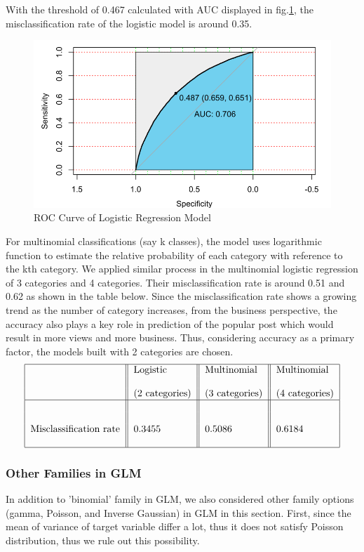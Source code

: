 \documentclass[letterpaper,12pt]{article}
\begin{document}
With the threshold of 0.467 calculated with AUC displayed in fig.\ref{fig11}, the misclassification rate of the logistic model is around 0.35.
\begin{figure}
\centering
    \includegraphics[width=0.7\linewidth]{11.png}
    \caption{ROC Curve of Logistic Regression Model}
    \label{fig11}
\end{figure}

For multinomial classifications (say k classes), the model uses logarithmic function to estimate the relative probability of each category with reference to the kth category. We applied similar process in the multinomial logistic regression of 3 categories and 4 categories. Their misclassification rate is around 0.51 and 0.62 as shown in the table below. Since the misclassification rate shows a growing trend as the number of category increases, from the business perspective, the accuracy also plays a key role in prediction of the popular post which would result in more views and more business. Thus, considering accuracy as a primary factor, the models built with 2 categories are chosen.
\[\begin{tabular}{|l||l||l||l|}
\hline & Logistic & Multinomial & Multinomial \\
& & & \\
& \((2\) categories) & \((3\) categories) & \((4\) categories) \\
\hline & & & \\
& & & \\
Misclassification rate & 0.3455 & 0.5086 & 0.6184  \\
& & & \\
\hline
\end{tabular}\]

\subsubsection{Other Families in GLM}
In addition to 'binomial' family in GLM, we also considered other family options (gamma, Poisson, and Inverse Gaussian) in GLM in this section. First, since the mean of variance of target variable differ a lot, thus it does not satisfy Poisson distribution, thus we rule out this possibility. 
\end{document}
